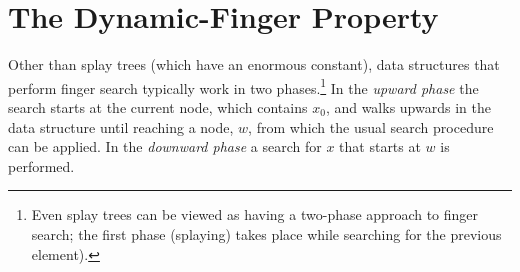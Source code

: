 \documentclass{patmorin}
\begin{document}
%
%
%
%
%
%
%
%


\section{The Dynamic-Finger Property}

Other than splay trees (which have an enormous constant), data structures
that perform finger search typically work in two phases.\footnote{Even
splay trees can be viewed as having a two-phase approach to finger search;
the first phase (splaying) takes place while searching for the previous
element).} In the \emph{upward phase} the search starts at the current
node, which contains $x_0$, and walks upwards in the data structure
until reaching a node, $w$, from which the usual search procedure can
be applied.  In the \emph{downward phase} a search for $x$ that starts
at $w$ is performed.
\end{document}
